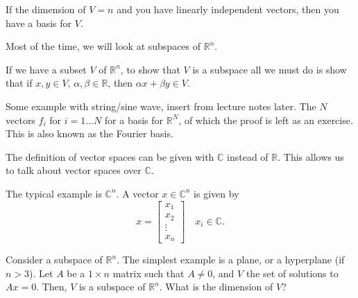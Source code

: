 
If the dimension of \( V = n \) and you have linearly independent vectors, then you have a basis for \( V \).

Most of the time, we will look at subspaces of \( \mathbb{R}^{n}  \).

\begin{note}
	If we have a subset \( V \) of \( \mathbb{R}^{n}  \), to show that \( V \) is a subspace all we must do is show that if \( x,y \in V \), \( \alpha ,\beta \in \mathbb{R} \), then \( \alpha x+\beta y \in V \).
\end{note}

\begin{eg}
	Some example with string/sine wave, insert from lecture notes later. The \( N \) vectors \( f_i \) for \( i=1\ldots N \) for a basis for \( \mathbb{R}^{N}  \), of which the proof is left as an exercise. This is also known as the Fourier basis.
\end{eg}

The definition of vector spaces can be given with \( \mathbb{C} \) instead of \( \mathbb{R} \). This allows us to talk about vector spaces over \( \mathbb{C} \).

\begin{eg}
	The typical example is \( \mathbb{C}^{n}  \). A vector \( x \in \mathbb{C}^{n}  \) is given by \[
		x = \begin{bmatrix}
			x_{1} \\ x_{2} \\ \vdots \\ x_n
		\end{bmatrix} \quad x_i \in \mathbb{C}
	.\] 
\end{eg}

Consider a subspace of \( \mathbb{R}^{n}  \). The simplest example is a plane, or a hyperplane (if \( n>3 \)). Let \( A \) be a \( 1\times n \) matrix such that \( A\neq 0 \), and \( V \) the set of solutions to \( Ax=0 \). Then, \( V \) is a subspace of \( \mathbb{R}^{n}  \). What is the dimension of \( V \)?
